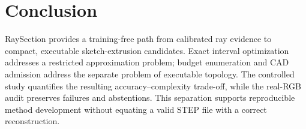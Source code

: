 \documentclass[10pt]{article}
\newcommand{\method}{RaySection}
\begin{document}
\section{Conclusion}
\method{} provides a training-free path from calibrated ray evidence to compact,
executable sketch-extrusion candidates. Exact interval optimization addresses a
restricted approximation problem; budget enumeration and CAD admission address
the separate problem of executable topology. The controlled study quantifies
the resulting accuracy--complexity trade-off, while the real-RGB audit preserves
failures and abstentions. This separation supports reproducible method
development without equating a valid STEP file with a correct reconstruction.



\end{document}
